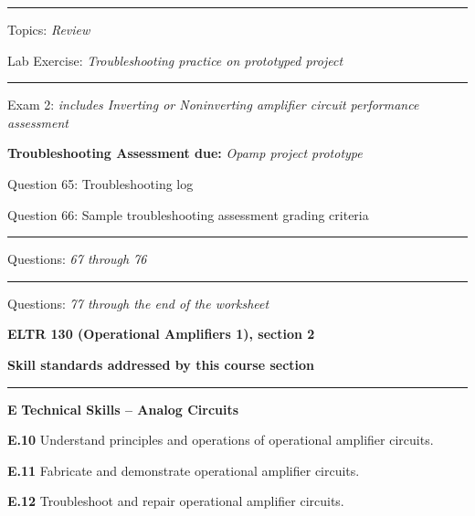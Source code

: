 \vskip 10pt
\hrule \vskip 5pt
\noindent
{}

\hskip 10pt Topics: {\it Review}
 
\hskip 10pt Lab Exercise: {\it Troubleshooting practice on prototyped project}
 
\vskip 10pt
\hrule \vskip 5pt
\noindent
{}

\hskip 10pt Exam 2: {\it includes Inverting or Noninverting amplifier circuit performance assessment}
 
\hskip 10pt {\bf Troubleshooting Assessment due:} {\it Opamp project prototype}
 
\hskip 10pt Question 65: Troubleshooting log
 
\hskip 10pt Question 66: Sample troubleshooting assessment grading criteria
 
\vskip 10pt
\hrule \vskip 5pt
\noindent
{}

\hskip 10pt Questions: {\it 67 through 76}
 
\vskip 10pt
\hrule \vskip 5pt
\noindent
{}

\hskip 10pt Questions: {\it 77 through the end of the worksheet}
 
\vskip 10pt











\vfil \eject

\centerline{\bf ELTR 130 (Operational Amplifiers 1), section 2} \bigskip 
 
\vskip 10pt

\noindent
{\bf Skill standards addressed by this course section}

\vskip 5pt

\hrule \vskip 10pt
\noindent
{}

\vskip 5pt

\medskip
\item{\bf E} {\bf Technical Skills -- Analog Circuits}
\item{\bf E.10} Understand principles and operations of operational amplifier circuits.
\item{\bf E.11} Fabricate and demonstrate operational amplifier circuits.
\item{\bf E.12} Troubleshoot and repair operational amplifier circuits.
\medskip

